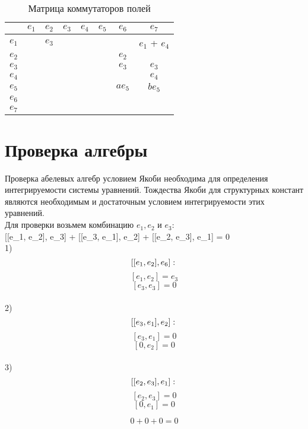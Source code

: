 \href{\href{}{}}{}\documentclass[14pt]{extarticle} %
\begin{document}
\begin{table}[h!]
    \centering
    \renewcommand{\arraystretch}{1.5}
    \setlength{\arrayrulewidth}{0.3mm}
    \begin{tabular}{|c|c|c|c|c|c|c|c|}
        \hline
        & $e_1$ & $e_2$ & $e_3$ & $e_4$ & $e_5$ & $e_6$ & $e_7$ \\
        \hline
        $e_1$ & & $e_3$ & & & & & $e_1$ + $e_4$ \\
        \hline
        $e_2$ & & & & & & $e_2$ & \\
        \hline
        $e_3$ & & & & & & $e_3$ & $e_3$\\
        \hline
        $e_4$ & & & & & & & $e_4$ \\
        \hline
        $e_5$ & & & & & & $a$$e_5$ & $b$$e_5$\\
        \hline
        $e_6$ & & & & & & & \\
        \hline
        $e_7$ & & & & & & & \\
        \hline
    \end{tabular}
    \caption{Матрица коммутаторов полей}
\end{table}

\newpage
\section{Проверка алгебры}

Проверка абелевых алгебр условием Якоби необходима для определения интегрируемости системы уравнений. Тождества Якоби для структурных констант являются необходимым и достаточным условием интегрируемости этих уравнений. \\

Для проверки возьмем комбинацию \(e_1, e_2\) и \(e_3:\) \\

[[e_1, e_2], e_3] + [[e_3, e_1], e_2] + [[e_2, e_3], e_1] = 0 \\

1)
\[
 [[e_1, e_2], e_6]: \\
\]
\[
[e_1, e_2] = e_3
\]
\[
[e_3, e_3] = 0
\] \\

2)
\[
[[e_3, e_1], e_2]: \\
\]
\[
[e_3, e_1] = 0
\]
\[
[0, e_2] = 0
\] \\

3)
\[
[[e_2, e_3], e_1]: \\
\]
\[
[e_2, e_3] = 0
\]
\[
[0, e_1] = 0
\]

\[
0 + 0 + 0 = 0
\]
\end{document}
